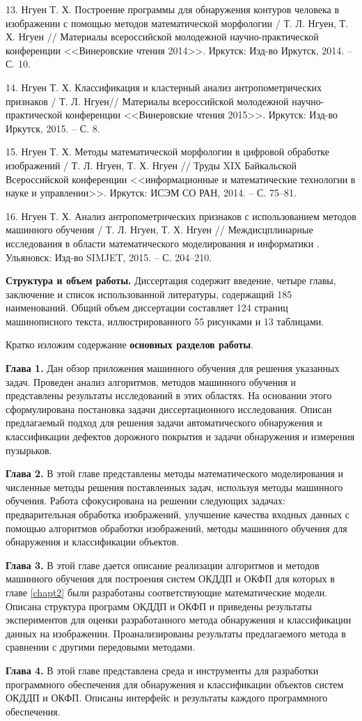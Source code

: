 13. Нгуен Т. Х. Построение программы для обнаружения контуров человека в изображении с помощью методов математической морфологии / Т. Л. Нгуен, Т. Х. Нгуен // Материалы всероссийской молодежной научно-практической конференции <<Винеровские чтения 2014>>. Иркутск: Изд-во Иркутск, 2014. -- С. 10.

14. Нгуен Т. Х. Классификация и кластерный анализ антропометрических признаков / Т. Л. Нгуен// Материалы всероссийской молодежной научно-практической конференции <<Винеровские чтения 2015>>. Иркутск: Изд-во Иркутск, 2015. -- С. 8.

15. Нгуен Т. Х. Методы математической морфологии в цифровой обработке изображений / Т. Л. Нгуен, Т. Х. Нгуен // Труды XIX Байкальской Всероссийской конференции <<информационные и математические технологии в науке и управлении>>. Иркутск: ИСЭМ СО РАН, 2014. -- С. 75--81.

16. Нгуен Т. Х. Анализ антропометрических признаков с использованием методов машинного обучения / Т. Л. Нгуен, Т. Х. Нгуен // Междисцплинарные исследования в области математического моделирования и информатики . Ульяновск: Изд-во SIMJET, 2015. -- С. 204--210.

\textbf{Структура и объем работы.} Диссертация содержит введение, четыре главы, заключение и список использованной литературы, содержащий 185 наименований. Общий объем диссертации составляет 124 страниц машинописного текста, иллюстрированного 55 рисунками и 13 таблицами.

Кратко изложим содержание \textbf{основных разделов работы}.

\textbf{Глава 1.} Дан обзор приложения машинного обучения для решения указанных задач. Проведен анализ алгоритмов, методов машинного обучения и представлены результаты исследований в этих областях. На основании этого сформулирована постановка задачи диссертационного исследования. Описан предлагаемый подход для решения задачи автоматического обнаружения и классификации дефектов дорожного покрытия и задачи обнаружения и измерения пузырьков.

\textbf{Глава 2.} В этой главе представлены методы математического моделирования и численные методы решения поставленных задач, используя методы машинного обучения. Работа сфокусирована на решении следующих задачах: предварительная обработка изображений, улучшение качества входных данных с помощью алгоритмов обработки изображений, методы машинного обучения для обнаружения и классификации объектов. 

\textbf{Глава 3.} В этой главе дается описание реализации алгоритмов и методов машинного обучения для построения систем ОКДДП и ОКФП для которых в главе \ref{chapt2} были разработаны соответствующие математические модели. Описана структура программ ОКДДП и ОКФП и приведены результаты экспериментов для оценки разработанного метода обнаружения и классификации данных на изображении. Проанализированы результаты предлагаемого метода в сравнении с другими передовыми методами. 

\textbf{Глава 4.} В этой главе представлена среда и инструменты для разработки программного обеспечения для обнаружения и классификации объектов систем ОКДДП и ОКФП. Описаны интерфейс и результаты каждого программного обеспечения.

